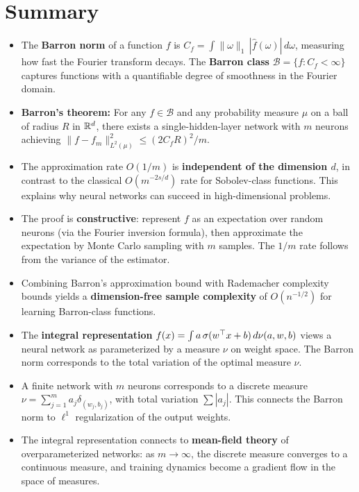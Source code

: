 \documentclass[11pt,a4paper]{article}
\begin{document}
\section{Summary}
\label{sec:summary}

\begin{itemize}
  \item The \textbf{Barron norm} of a function $f$ is $C_f = \int
    \|\omega\|_1 \, |\hat{f}(\omega)| \, d\omega$, measuring how fast
    the Fourier transform decays.  The \textbf{Barron class}
    $\mathcal{B} = \{f : C_f < \infty\}$ captures functions with a
    quantifiable degree of smoothness in the Fourier domain.

  \item \textbf{Barron's theorem:} For any $f \in \mathcal{B}$ and any
    probability measure $\mu$ on a ball of radius $R$ in $\mathbb{R}^d$, there
    exists a single-hidden-layer network with $m$ neurons achieving
    $\|f - f_m\|_{L^2(\mu)}^2 \le (2C_f R)^2 / m$.

  \item The approximation rate $O(1/m)$ is \textbf{independent of the
    dimension $d$}, in contrast to the classical $O(m^{-2s/d})$ rate for
    Sobolev-class functions.  This explains why neural networks can
    succeed in high-dimensional problems.

  \item The proof is \textbf{constructive}: represent $f$ as an
    expectation over random neurons (via the Fourier inversion formula),
    then approximate the expectation by Monte Carlo sampling with $m$
    samples.  The $1/m$ rate follows from the variance of the estimator.

  \item Combining Barron's approximation bound with Rademacher
    complexity bounds yields a \textbf{dimension-free sample complexity}
    of $O(n^{-1/2})$ for learning Barron-class functions.

  \item The \textbf{integral representation} $f(x) = \int a \,
    \sigma(w^\top x + b) \, d\nu(a,w,b)$ views a neural network as
    parameterized by a measure $\nu$ on weight space.  The Barron norm
    corresponds to the total variation of the optimal measure $\nu$.

  \item A finite network with $m$ neurons corresponds to a discrete
    measure $\nu = \sum_{j=1}^m a_j \delta_{(w_j, b_j)}$, with total
    variation $\sum |a_j|$.  This connects the Barron norm to $\ell^1$
    regularization of the output weights.

  \item The integral representation connects to \textbf{mean-field
    theory} of overparameterized networks: as $m \to \infty$, the
    discrete measure converges to a continuous measure, and training
    dynamics become a gradient flow in the space of measures.
\end{itemize}
\end{document}
